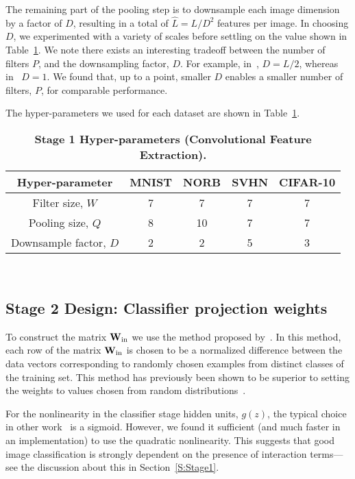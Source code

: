 \documentclass[conference]{IEEEtran}
\begin{document}
The remaining part of the pooling step is to downsample each image dimension by a factor of $D$, resulting in a total of $\hat{L} = L/D^2$ features per image. In choosing $D$, we experimented with a variety of scales before settling on the value  shown in Table~\ref{Table2}. We note there exists an interesting tradeoff between the number of filters $P$, and the downsampling factor, $D$. For example, in~\cite{Coates.11}, $D=L/2$, whereas in~\cite{Le.10} $D=1$.  We found that, up to a point, smaller $D$ enables a smaller number of filters, $P$, for comparable performance.

The hyper-parameters we used for each dataset are shown in Table~\ref{Table2}.

\begin{table}[!ht]
{\footnotesize
\begin{tabular}{|c|c|c|c|c|}
\hline
Hyper-parameter & MNIST & NORB & SVHN & CIFAR-10\\
\hline
Filter size, $W$ & 7 & 7 & 7 & 7\\
Pooling size, $Q$ & 8 & 10 & 7 & 7\\
Downsample factor,  $D$ & 2 & 2 & 5 & 3\\
\hline
\end{tabular}
~\\
\caption{\bf{Stage 1 Hyper-parameters (Convolutional Feature Extraction).  }}\label{Table2}
}
\end{table}


\subsection{Stage 2 Design: Classifier projection weights}

To construct the  matrix ${\bf W}_{\rm in}$ we use the method proposed by~\cite{Zhu.14}. In this method, each row of the matrix ${\bf W}_{\rm in}$ is chosen to be a normalized difference between the data vectors corresponding to randomly chosen examples from distinct classes of the training set. This method has previously been shown to be superior to setting the weights to values chosen from random distributions~\cite{Zhu.14,McDonnell.15PLOS}.

For the nonlinearity in the classifier stage hidden units, $g(z)$, the typical choice in other work~\cite{Huang.14}  is  a sigmoid. However, we found it sufficient (and much faster in an implementation) to use the quadratic nonlinearity. This suggests that good image classification is strongly dependent on  the presence of interaction terms---see the discussion about this in Section~\ref{S:Stage1}.
\end{document}
